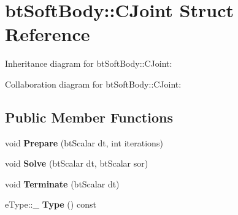 \hypertarget{structbt_soft_body_1_1_c_joint}{\section{bt\+Soft\+Body\+:\+:C\+Joint Struct Reference}
\label{structbt_soft_body_1_1_c_joint}
}


Inheritance diagram for bt\+Soft\+Body\+:\+:C\+Joint\+:


Collaboration diagram for bt\+Soft\+Body\+:\+:C\+Joint\+:
\subsection*{Public Member Functions}
\begin{DoxyCompactItemize}
\item 
\hypertarget{structbt_soft_body_1_1_c_joint_a632281fa2e040825aea5c0f871a89587}{void {\bfseries Prepare} (bt\+Scalar dt, int iterations)}\label{structbt_soft_body_1_1_c_joint_a632281fa2e040825aea5c0f871a89587}

\item 
\hypertarget{structbt_soft_body_1_1_c_joint_aea04c88d0da5c5dbecc545a06af7b97a}{void {\bfseries Solve} (bt\+Scalar dt, bt\+Scalar sor)}\label{structbt_soft_body_1_1_c_joint_aea04c88d0da5c5dbecc545a06af7b97a}

\item 
\hypertarget{structbt_soft_body_1_1_c_joint_a12ae7ef7a49dc7c32c104bcb170d54d5}{void {\bfseries Terminate} (bt\+Scalar dt)}\label{structbt_soft_body_1_1_c_joint_a12ae7ef7a49dc7c32c104bcb170d54d5}

\item 
\hypertarget{structbt_soft_body_1_1_c_joint_aaf17e38eb4a25f42760174cc807c3195}{e\+Type\+::\+\_\+ {\bfseries Type} () const }\label{structbt_soft_body_1_1_c_joint_aaf17e38eb4a25f42760174cc807c3195}

\end{DoxyCompactItemize}
